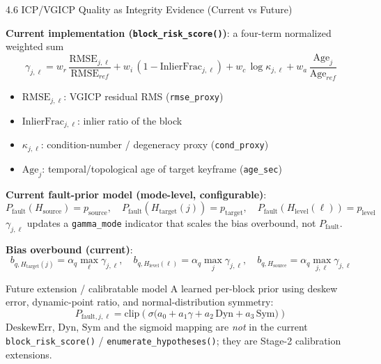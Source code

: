 \documentclass[10pt,aspectratio=169,xcolor=dvipsnames]{beamer}
\newcommand{\1}{\mathbb{1}}
\begin{document}
\begin{frame}[t]{4.6 ICP/VGICP Quality as Integrity Evidence (Current vs Future)}
  \scriptsize
  \vspace{-2pt}
  \setlength{\abovedisplayskip}{3pt}
  \setlength{\belowdisplayskip}{3pt}
  \setlength{\abovedisplayshortskip}{2pt}
  \setlength{\belowdisplayshortskip}{2pt}

  \textbf{Current implementation (\texttt{block\_risk\_score()})}: a four-term normalized weighted sum
  {\footnotesize
    \[
      \gamma_{j,\ell} = w_r\,\frac{\mathrm{RMSE}_{j,\ell}}{\mathrm{RMSE}_{ref}}
      + w_i\,(1 - \mathrm{InlierFrac}_{j,\ell})
      + w_c\,\log\kappa_{j,\ell}
      + w_a\,\frac{\mathrm{Age}_j}{\mathrm{Age}_{ref}}
  \]}
  \begin{itemize}\tiny
      \setlength{\itemsep}{0.5pt}
    \item \(\mathrm{RMSE}_{j,\ell}\): VGICP residual RMS (\texttt{rmse\_proxy})
    \item \(\mathrm{InlierFrac}_{j,\ell}\): inlier ratio of the block
    \item \(\kappa_{j,\ell}\): condition-number / degeneracy proxy (\texttt{cond\_proxy})
    \item \(\mathrm{Age}_j\): temporal/topological age of target keyframe (\texttt{age\_sec})
  \end{itemize}

  \textbf{Current fault-prior model (mode-level, configurable)}:
  {\footnotesize
    \[
      P_{\mathrm{fault}}(H_{\mathrm{source}}) = p_{\mathrm{source}},\quad
      P_{\mathrm{fault}}(H_{\mathrm{target}}(j)) = p_{\mathrm{target}},\quad
      P_{\mathrm{fault}}(H_{\mathrm{level}}(\ell)) = p_{\mathrm{level}}
  \]}
  \tiny \(\gamma_{j,\ell}\) updates a \texttt{gamma\_mode} indicator that scales the bias overbound, not \(P_{\mathrm{fault}}\).

  \textbf{Bias overbound (current)}:
  {\footnotesize
    \[
      b_{q,H_{\mathrm{target}}(j)}=\alpha_q\max_{\ell}\gamma_{j,\ell},\quad
      b_{q,H_{\mathrm{level}}(\ell)}=\alpha_q\max_{j}\gamma_{j,\ell},\quad
      b_{q,H_{\mathrm{source}}}=\alpha_q\max_{j,\ell}\gamma_{j,\ell}
  \]}

  \begin{alertblock}{\scriptsize Future extension / calibratable model}
    \tiny
    A learned per-block prior using deskew error, dynamic-point ratio, and normal-distribution symmetry:
    {\footnotesize
      \[
        P_{\mathrm{fault},j,\ell} = \mathrm{clip}\!\left(\sigma\!\bigl(a_0 + a_1\gamma + a_2\,\mathrm{Dyn} + a_3\,\mathrm{Sym}\bigr)\right)
    \]}
    \(\mathrm{DeskewErr}\), \(\mathrm{Dyn}\), \(\mathrm{Sym}\) and the sigmoid mapping are \emph{not} in the current \texttt{block\_risk\_score()} / \texttt{enumerate\_hypotheses()}; they are Stage-2 calibration extensions.
  \end{alertblock}
\end{frame}
\end{document}

